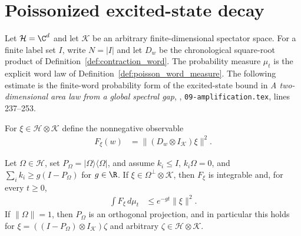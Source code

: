 \section{Poissonized excited-state decay}
\label{sec:poisson_contraction_decay}

Let $\mathcal H=\C^d$ and let $\mathcal K$ be an arbitrary finite-dimensional
spectator space.  For a finite label set $I$, write $N=|I|$ and let
$D_w$ be the chronological square-root product of
Definition~\ref{def:contraction_word}.  The probability measure $\mu_t$
is the explicit word law of Definition~\ref{def:poisson_word_measure}.
The following estimate is the finite-word probability form of the excited-state
bound in \emph{A two-dimensional area law from a global spectral gap},
\cite{OpenAI2026AreaLaw}, \texttt{09-amplification.tex}, lines 237--253.

\begin{definition}
    \label{def:poisson_contraction_energy}
    \leanok
    For $\xi\in\mathcal H\otimes\mathcal K$ define the nonnegative observable
    \begin{align}
        F_\xi(w)&=\|(D_w\otimes I_{\mathcal K})\xi\|^2.
        \label{eq:poisson_contraction_energy}
    \end{align}
\end{definition}

\begin{theorem}
    \label{thm:poisson_contraction_decay}
    \leanok
    Let $\Omega\in\mathcal H$, set $P_\Omega=|\Omega\rangle\langle\Omega|$,
    and assume $k_i\le I$, $k_i\Omega=0$, and
    $\sum_i k_i\ge g(I-P_\Omega)$ for $g\in\R$.
    If $\xi\in\Omega^\perp\otimes\mathcal K$, then $F_\xi$ is integrable
    and, for every $t\ge0$,
    \begin{align}
        \int F_\xi\,d\mu_t
        &\le e^{-gt}\|\xi\|^2.
        \label{eq:poisson_contraction_decay}
    \end{align}
    If $\|\Omega\|=1$, then $P_\Omega$ is an orthogonal projection,
    and in particular this holds for
    $\xi=((I-P_\Omega)\otimes I_{\mathcal K})\zeta$ and arbitrary
    $\zeta\in\mathcal H\otimes\mathcal K$.
\end{theorem}


